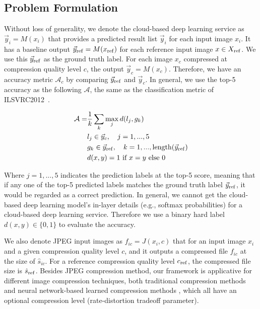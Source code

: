 \vspace{-1em}

\subsection{Problem Formulation}
\label{subsec: formulation}
Without loss of generality, we denote the cloud-based deep learning service as $ \vec{y}_i = M(x_i) $ that provides a predicted result list $ \vec{y}_i $ for each input image $ x_i $. It has a baseline output $ \vec{y}_{\rm ref} = M(x_{\rm ref}) $ for each reference input image $ x \in X_{\rm ref} $. We use this $ \vec{y}_{\rm ref} $ as the ground truth label. For each image $ x_c $ compressed at compression quality level $ c $, the output $ \vec{y}_c = M(x_c) $. Therefore, we have an accuracy metric $ \mathcal{A}_c $ by comparing $ \vec{y}_{\rm ref} $ and $ \vec{y}_c $. In general, we use the top-5 accuracy as the following $ \mathcal{A} $, the same as the classification metric of ILSVRC2012~\cite{ILSVRC12}.

\begin{align}
\mathcal{A} =& \frac{1}{k} \sum_{k}\max_jd(l_j, g_k) \\
& l_j \in \vec{y}_c, \quad j=1,...,5 \\
& g_k \in \vec{y}_{\rm ref}, \quad k=1, ..., {\rm length}(\vec{y}_{\rm ref}) \\
& d(x, y) = 1 \ \text{if} \ x=y  \ \text{else} \ 0 
\end{align}

Where $ j = 1,...,5 $ indicates the prediction labels at the top-5 score, meaning that if any one of the top-5 predicted labels matches the ground truth label $ \vec{y}_{\rm ref} $, it would be regarded as a correct prediction. In general, we cannot get the cloud-based deep learning model's in-layer details (e.g., softmax probabilities) for a cloud-based deep learning service. Therefore we use a binary hard label $ d(x, y) \in \{0, 1\} $ to evaluate the accuracy. %

We also denote JPEG input images as $ f_{ic} = J(x_i, c) $ that for an input image $ x_i $ and a given compression quality level $ c $, and it outputs a compressed file $ f_{ic} $ at the size of {\color{revise2} $ \hat{s}_{ic} $}. For a reference compression quality level $ c_{\rm ref} $, the compressed file size is {\color{revise2} $ \hat{s}_{\rm ref} $}. {\color{revise3}Besides JPEG compression method, our framework is applicative for different image compression techniques, both traditional compression methods \cite{jpeg,webp,hevc,vvc} and neural network-based learned compression methods \cite{endtoend1,endtoend2,endtoend3,endtoend4}, which all have an optional compression level (rate-distortion tradeoff parameter).} 

